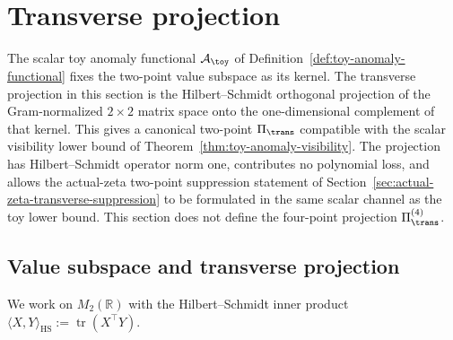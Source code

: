 %

\section{Transverse projection}
\label{sec:transverse-projection}
\quad
{}\quad
{}\quad
{}\quad
{}\quad
{}
\par\medskip

The scalar toy anomaly functional \(\mathcal A_\toy\) of
Definition~\ref{def:toy-anomaly-functional} fixes the two-point value
subspace as its kernel.  The transverse projection in this section is
the Hilbert--Schmidt orthogonal projection of the Gram-normalized
\(2\times2\) matrix space onto the one-dimensional complement of that
kernel.  This gives a canonical two-point \(\Pi_\trans\) compatible with
the scalar visibility lower bound of
Theorem~\ref{thm:toy-anomaly-visibility}.  The projection has
Hilbert--Schmidt operator norm one, contributes no polynomial loss, and
allows the actual-zeta two-point suppression statement of
Section~\ref{sec:actual-zeta-transverse-suppression} to be formulated in
the same scalar channel as the toy lower bound.  This section does not
define the four-point projection \(\Pi_\trans^{(4)}\).

\subsection{Value subspace and transverse projection}
\label{subsec:transverse-projection-construction}

We work on \(M_{2}(\mathbb R)\) with the Hilbert--Schmidt inner product
\(
        \langle X,Y\rangle_{\mathrm{HS}}
        :=\operatorname{tr}(X^\top Y).
\)

